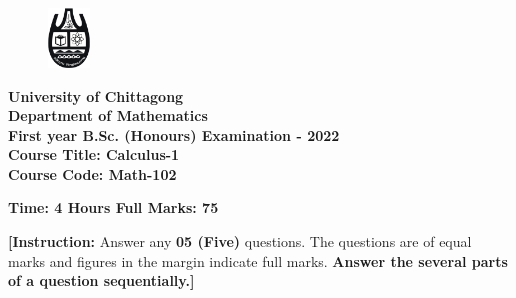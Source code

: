 \documentclass[12pt]{article}
\begin{document}
  \begin{center}
    \begin{figure}[t]
      \centering
      \includegraphics[width=0.1\textwidth]{cu_logo.png}
    \end{figure}

    {\bfseries \large University of Chittagong\\
    Department of Mathematics\\
    First year B.Sc. (Honours) Examination - 2022\\
    Course Title: Calculus-1\\
    Course Code: Math-102\\[15pt]}

    {\bfseries \normalsize Time: 4 Hours \hspace{23em} Full Marks: 75\\[15pt]}

    {\normalsize \textbf{[Instruction:} Answer any \textbf{05 (Five)} questions. The questions are of equal marks and figures in the margin indicate full marks. \textbf{Answer the several parts of a question sequentially.]}\\[15pt]}
  \end{center}
\end{document}
